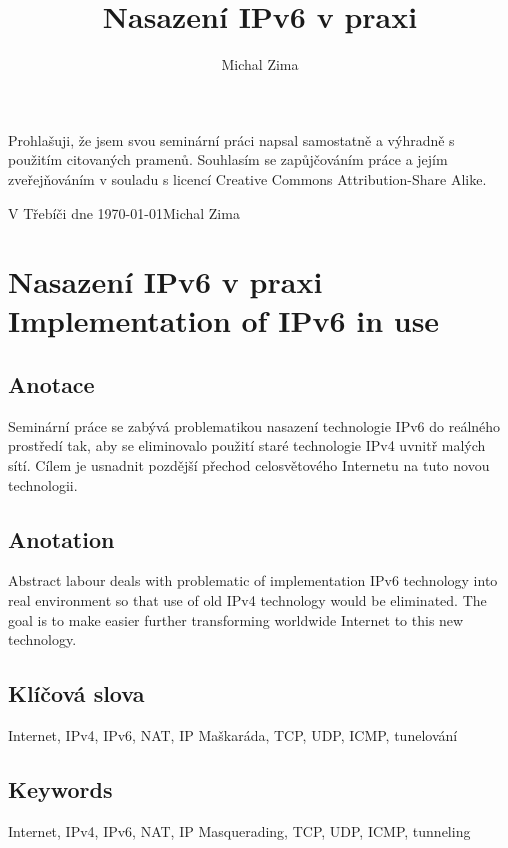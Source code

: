 \documentclass[12pt]{report}
\title{Nasazení IPv6 v praxi}
\author{Michal Zima}
\date{}
\begin{document}
\maketitle
\setcounter{page}{2}	%


\thispagestyle{empty}
Prohlašuji, že jsem svou seminární práci napsal samostatně a výhradně s použitím citovaných pramenů. Souhlasím se zapůjčováním práce a jejím zveřejňováním v souladu s licencí Creative Commons Attribution-Share Alike.

\bigskip	%
\noindent V Třebíči dne \today \hspace{\fill}Michal Zima
\newpage{}


\thispagestyle{plain}
\section*{Nasazení IPv6 v praxi\\Implementation of IPv6 in use}

\subsection*{Anotace}
Seminární práce se zabývá problematikou nasazení technologie IPv6 do reálného prostředí tak, aby se eliminovalo použití staré technologie IPv4 uvnitř malých sítí. Cílem je usnadnit pozdější přechod celosvětového Internetu na tuto novou technologii.

\subsection*{Anotation}
Abstract labour deals with problematic of implementation IPv6 technology into real environment so that use of old IPv4 technology would be eliminated. The goal is to make easier further transforming worldwide Internet to this new technology.

\subsection*{Klíčová slova}
Internet, IPv4, IPv6, NAT, IP Maškaráda, TCP, UDP, ICMP, tunelování

\subsection*{Keywords}
Internet, IPv4, IPv6, NAT, IP Masquerading, TCP, UDP, ICMP, tunneling
\newpage{}
\end{document}
